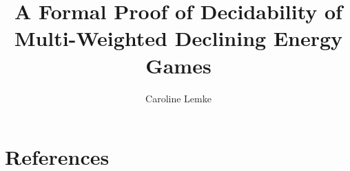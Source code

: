 \documentclass[11pt,a4paper]{article}
\begin{document}
\title{A Formal Proof of Decidability of Multi-Weighted Declining Energy Games}
\author{Caroline Lemke}
\maketitle

\tableofcontents


\newpage

\newpage

\newpage

\newpage

\newpage

\newpage


\newpage
\section{References}



\newpage
\appendix

\end{document}

